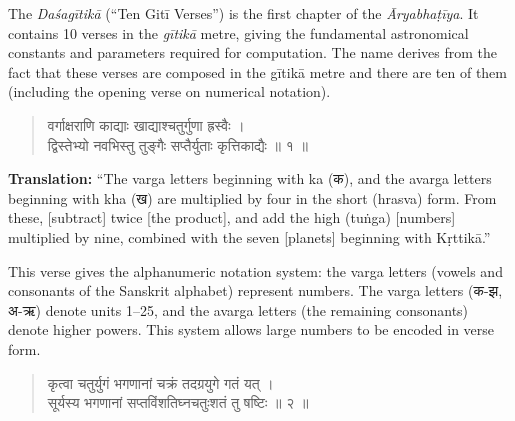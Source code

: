 \documentclass[11pt,a4paper]{article}
\newcommand{\dev}[1]{{\devanagarifont #1}}
\newenvironment{sanskritverse}{\begin{verse}\devanagarifont\large\centering}{\end{verse}}
\begin{document}
\noindent
The \textit{Daśagītikā} (``Ten Gitī Verses'') is the first chapter of the \textit{Āryabhaṭīya}. It contains 10 verses in the \textit{gītikā} metre, giving the fundamental astronomical constants and parameters required for computation. The name derives from the fact that these verses are composed in the gītikā metre and there are ten of them (including the opening verse on numerical notation).

\vspace{0.3cm}

\begin{tcolorbox}[colback=white,colframe=rulecolor,title={\dev{\textbf{दशगीतिका १ — अक्षरसंख्या (Letter-Numeral Notation)}}}]
\begin{sanskritverse}
\dev{वर्गाक्षराणि काद्याः खाद्याश्चतुर्गुणा ह्रस्वैः ।\\
द्विस्तेभ्यो नवभिस्तु तुङ्गैः सप्तैर्युताः कृत्तिकाद्यैः ॥ १ ॥}
\end{sanskritverse}
\end{tcolorbox}

\vspace{0.3cm}
\noindent\textbf{Translation:} ``The varga letters beginning with ka (क), and the avarga letters beginning with kha (ख) are multiplied by four in the short (hrasva) form. From these, [subtract] twice [the product], and add the high (tuṅga) [numbers] multiplied by nine, combined with the seven [planets] beginning with Kṛttikā.''

\smallskip
\noindent This verse gives the alphanumeric notation system: the varga letters (vowels and consonants of the Sanskrit alphabet) represent numbers. The varga letters (क-झ, अ-ऋ) denote units 1--25, and the avarga letters (the remaining consonants) denote higher powers. This system allows large numbers to be encoded in verse form.

\vspace{0.5cm}

\begin{tcolorbox}[colback=white,colframe=rulecolor,title={\dev{\textbf{दशगीतिका २ — युगभगणाः (Revolutions in a Yugá)}}}]
\begin{sanskritverse}
\dev{कृत्वा चतुर्युगं भगणानां चक्रं तदग्रयुगे गतं यत् ।\\
सूर्यस्य भगणानां सप्तविंशतिघ्नचतुःशतं तु षष्टिः ॥ २ ॥}
\end{sanskritverse}
\end{tcolorbox}
\end{document}
